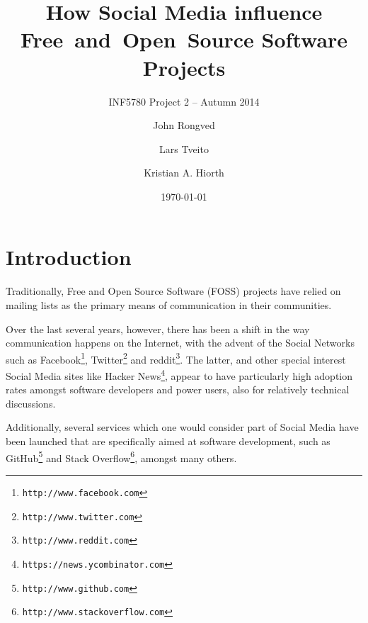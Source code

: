 \documentclass[a4paper,11pt]{article} %
\title{How Social Media influence \hbox{Free and Open Source} Software Projects}
\subtitle{INF5780 Project 2 -- Autumn 2014}
\date{\today}
\author{John Rongved \and Lars Tveito \and Kristian A. Hiorth}
\begin{document}
\ififorside{}

\tableofcontents{}
\newpage

\section{Introduction}

Traditionally, Free and Open Source Software (FOSS) projects have
relied on mailing lists as the primary means of communication in
their communities. %

Over the last several years, however, there has been a shift in the way
communication happens on the Internet, with the advent of the Social
Networks such as Facebook\footnote{\texttt{http://www.facebook.com}}, Twitter\footnote{\texttt{http://www.twitter.com}} and reddit\footnote{\texttt{http://www.reddit.com}}.
The latter, and other special
interest Social Media sites like Hacker News\footnote{\texttt{https://news.ycombinator.com}}, appear to have particularly
high adoption rates amongst software developers and power users, also for
relatively technical discussions.

Additionally, several services which one would consider part of Social Media
have been launched that are specifically aimed at software development, such
as GitHub\footnote{\texttt{http://www.github.com}} and Stack Overflow\footnote{\texttt{http://www.stackoverflow.com}}, amongst many others.

\end{document}
